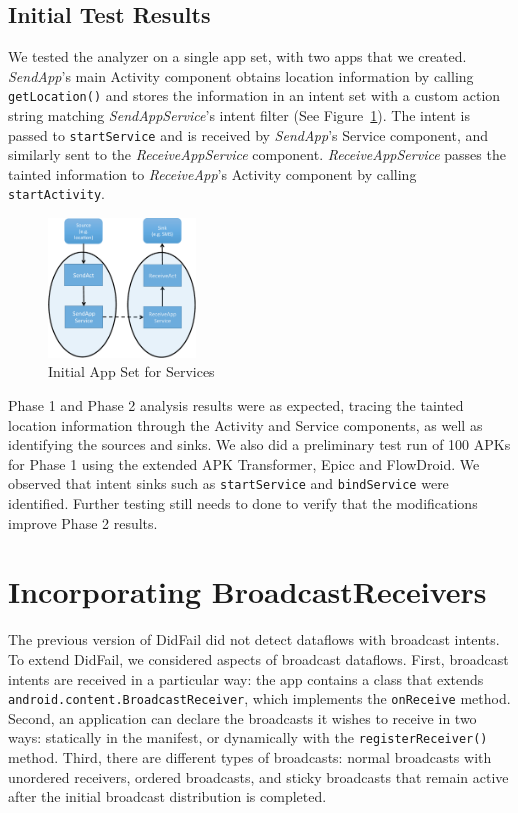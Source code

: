 \section{Initial Test Results}
We tested the analyzer on a single app set, with two apps that we created. \emph{SendApp}'s main Activity component obtains location information by calling \texttt{getLocation()} and stores the information in an intent set with a custom action string matching \emph{SendAppService}'s intent filter (See Figure~\ref{fig:servicetest1}). The intent is passed to \texttt{startService} and is received by \emph{SendApp}'s Service component, and similarly sent to the \emph{ReceiveAppService} component. \emph{ReceiveAppService} passes the tainted information to \emph{ReceiveApp}'s Activity component by calling \texttt{startActivity}.

\begin{figure}[h]
	\centering
	\includegraphics[width=0.35\textwidth]{serviceapp.pdf}
	\caption{Initial App Set for Services}
	\label{fig:servicetest1}
\end{figure}

Phase 1 and Phase 2 analysis results were as expected, tracing the tainted location information through the Activity and Service components, as well as identifying the sources and sinks. We also did a preliminary test run of 100 APKs for Phase 1 using the extended APK Transformer, Epicc and FlowDroid. We observed that intent sinks such as \texttt{startService} and \texttt{bindService} were identified. Further testing still needs to done to verify that the modifications improve Phase 2 results.

\chapter{Incorporating BroadcastReceivers}
The previous version of DidFail did not detect dataflows with broadcast intents. To extend DidFail, we considered aspects of broadcast dataflows. First, broadcast intents are received in a particular way: the app contains a class that extends \texttt{android.content.BroadcastReceiver}, which implements the \texttt{onReceive} method. Second, an application can declare the broadcasts it wishes to receive in two ways: statically in the manifest, or dynamically with the \texttt{registerReceiver()} method. Third, there are different types of broadcasts: normal broadcasts with unordered receivers, ordered broadcasts, and sticky broadcasts that remain active after the initial broadcast distribution is completed.

